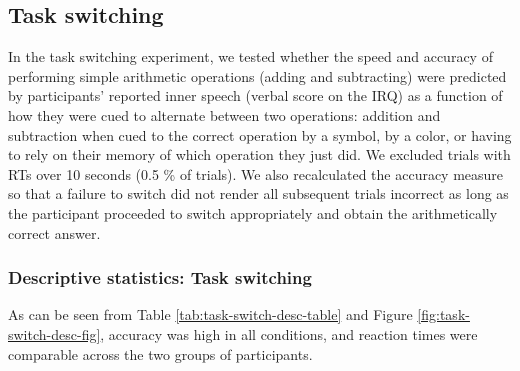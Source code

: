 \documentclass[
  man,a4paper,floatsintext]{apa6}
\begin{document}
\hypertarget{task-switching}{%
\subsection{Task switching}\label{task-switching}}

In the task switching experiment, we tested whether the speed and accuracy of performing simple arithmetic operations (adding and subtracting) were predicted by participants' reported inner speech (verbal score on the IRQ) as a function of how they were cued to alternate between two operations: addition and subtraction when cued to the correct operation by a symbol, by a color, or having to rely on their memory of which operation they just did. We excluded trials with RTs over 10 seconds (0.5 \% of trials). We also recalculated the accuracy measure so that a failure to switch did not render all subsequent trials incorrect as long as the participant proceeded to switch appropriately and obtain the arithmetically correct answer.

\hypertarget{descriptive-statistics-task-switching}{%
\subsubsection{Descriptive statistics: Task switching}\label{descriptive-statistics-task-switching}}

As can be seen from Table \ref{tab:task-switch-desc-table} and Figure \ref{fig:task-switch-desc-fig}, accuracy was high in all conditions, and reaction times were comparable across the two groups of participants.
\end{document}
